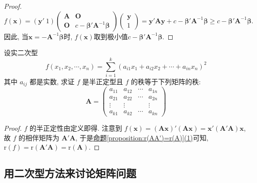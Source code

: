 \documentclass[../../main.tex]{subfiles}
\begin{document}
\begin{proof}
\[
f(\boldsymbol{x})=(\boldsymbol{y}'\ 1)\begin{pmatrix}
\boldsymbol{A} & \boldsymbol{O} \\
\boldsymbol{O} & c - \boldsymbol{\beta}'\boldsymbol{A}^{-1}\boldsymbol{\beta}
\end{pmatrix}\begin{pmatrix}
\boldsymbol{y} \\
1
\end{pmatrix}=\boldsymbol{y}'\boldsymbol{A}\boldsymbol{y}+c - \boldsymbol{\beta}'\boldsymbol{A}^{-1}\boldsymbol{\beta}\geq c - \boldsymbol{\beta}'\boldsymbol{A}^{-1}\boldsymbol{\beta}.
\]
因此, 当$\boldsymbol{x}=-\boldsymbol{A}^{-1}\boldsymbol{\beta}$时, $f(\boldsymbol{x})$取到极小值$c - \boldsymbol{\beta}'\boldsymbol{A}^{-1}\boldsymbol{\beta}$. 
\end{proof}

\begin{proposition}\label{proposition:和的平方和的半正定型的秩等于其系数矩阵的秩}
设实二次型
\[f(x_1,x_2,\cdots,x_n)=\sum_{i = 1}^{k}(a_{i1}x_1 + a_{i2}x_2 + \cdots + a_{in}x_n)^2\]
其中 \(a_{ij}\) 都是实数, 求证 \(f\) 是半正定型且 \(f\) 的秩等于下列矩阵的秩:
\[
\boldsymbol{A} = \begin{pmatrix}
a_{11} & a_{12} & \cdots & a_{1n} \\
a_{21} & a_{22} & \cdots & a_{2n} \\
\vdots & \vdots & & \vdots \\
a_{k1} & a_{k2} & \cdots & a_{kn}
\end{pmatrix}
\]
\end{proposition}
\begin{proof}
\(f\) 的半正定性由定义即得. 注意到 \(f(\boldsymbol{x}) = (\boldsymbol{A}\boldsymbol{x})'(\boldsymbol{A}\boldsymbol{x}) = \boldsymbol{x}'(\boldsymbol{A}'\boldsymbol{A})\boldsymbol{x}\), 故 \(f\) 的相伴矩阵为 \(\boldsymbol{A}'\boldsymbol{A}\), 于是\hyperref[proposition:r(AA')=r(A)]{命题\ref{proposition:r(AA')=r(A)}(1)}可知, \(\mathrm{r}(f)=\mathrm{r}(\boldsymbol{A}'\boldsymbol{A})=\mathrm{r}(\boldsymbol{A})\). 
\end{proof}

\subsection{用二次型方法来讨论矩阵问题}
\end{document}
